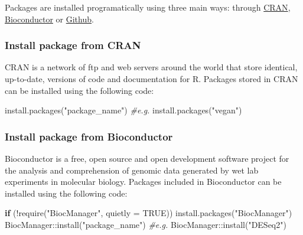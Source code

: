 \documentclass[
]{book}
\newenvironment{Shaded}{\begin{snugshade}}{\end{snugshade}}
\newcommand{\AttributeTok}[1]{\textcolor[rgb]{0.77,0.63,0.00}{#1}}
\newcommand{\CommentTok}[1]{\textcolor[rgb]{0.56,0.35,0.01}{\textit{#1}}}
\newcommand{\ConstantTok}[1]{\textcolor[rgb]{0.00,0.00,0.00}{#1}}
\newcommand{\ControlFlowTok}[1]{\textcolor[rgb]{0.13,0.29,0.53}{\textbf{#1}}}
\newcommand{\FunctionTok}[1]{\textcolor[rgb]{0.00,0.00,0.00}{#1}}
\newcommand{\NormalTok}[1]{#1}
\newcommand{\SpecialCharTok}[1]{\textcolor[rgb]{0.00,0.00,0.00}{#1}}
\newcommand{\StringTok}[1]{\textcolor[rgb]{0.31,0.60,0.02}{#1}}
\begin{document}
Packages are installed programatically using three main ways: through \href{https://cran.r-project.org/web/packages/available_packages_by_name.html}{CRAN}, \href{https://www.bioconductor.org/packages/release/bioc/}{Bioconductor} or \href{https://github.com/}{Github}.

\hypertarget{install-package-from-cran}{%
\subsubsection*{Install package from CRAN}\label{install-package-from-cran}}

CRAN is a network of ftp and web servers around the world that store identical, up-to-date, versions of code and documentation for R. Packages stored in CRAN can be installed using the following code:

\begin{Shaded}
\begin{Highlighting}[]
\FunctionTok{install.packages}\NormalTok{(}\StringTok{"package\_name"}\NormalTok{)}
\CommentTok{\#e.g.}
\FunctionTok{install.packages}\NormalTok{(}\StringTok{"vegan"}\NormalTok{)}
\end{Highlighting}
\end{Shaded}

\hypertarget{install-package-from-bioconductor}{%
\subsubsection*{Install package from Bioconductor}\label{install-package-from-bioconductor}}

Bioconductor is a free, open source and open development software project for the analysis and comprehension of genomic data generated by wet lab experiments in molecular biology. Packages included in Bioconductor can be installed using the following code:

\begin{Shaded}
\begin{Highlighting}[]
\ControlFlowTok{if}\NormalTok{ (}\SpecialCharTok{!}\FunctionTok{require}\NormalTok{(}\StringTok{"BiocManager"}\NormalTok{, }\AttributeTok{quietly =} \ConstantTok{TRUE}\NormalTok{))}
    \FunctionTok{install.packages}\NormalTok{(}\StringTok{"BiocManager"}\NormalTok{)}
\NormalTok{BiocManager}\SpecialCharTok{::}\FunctionTok{install}\NormalTok{(}\StringTok{"package\_name"}\NormalTok{)}
\CommentTok{\#e.g.}
\NormalTok{BiocManager}\SpecialCharTok{::}\FunctionTok{install}\NormalTok{(}\StringTok{"DESeq2"}\NormalTok{)}
\end{Highlighting}
\end{Shaded}
\end{document}
